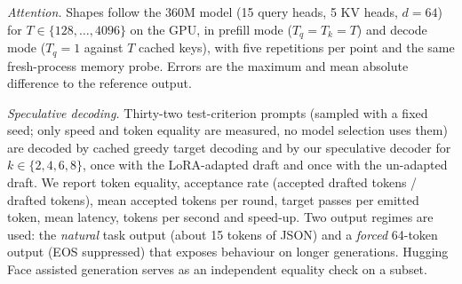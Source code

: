 \emph{Attention.} Shapes follow the 360M model (15 query heads, 5 KV heads, $d=64$) for $T\in\{128,\dots,4096\}$ on the GPU, in prefill mode ($T_q=T_k=T$) and decode mode ($T_q=1$ against $T$ cached keys), with five repetitions per point and the same fresh-process memory probe. Errors are the maximum and mean absolute difference to the reference output.

\emph{Speculative decoding.} Thirty-two test-criterion prompts (sampled with a fixed seed; only speed and token equality are measured, no model selection uses them) are decoded by cached greedy target decoding and by our speculative decoder for $k\in\{2,4,6,8\}$, once with the LoRA-adapted draft and once with the un-adapted draft. We report token equality, acceptance rate (accepted drafted tokens / drafted tokens), mean accepted tokens per round, target passes per emitted token, mean latency, tokens per second and speed-up. Two output regimes are used: the \emph{natural} task output (about 15 tokens of JSON) and a \emph{forced} 64-token output (EOS suppressed) that exposes behaviour on longer generations. Hugging Face assisted generation serves as an independent equality check on a subset.

